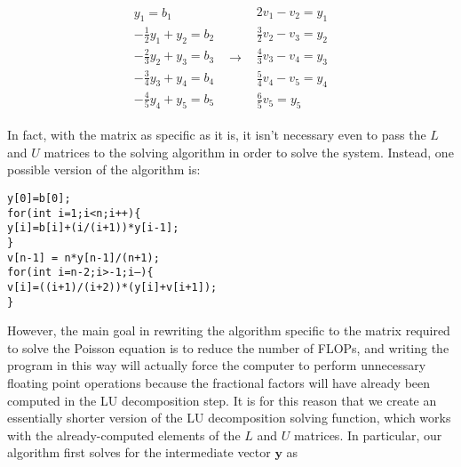 \documentclass[12pt]{article}
\numberwithin{equation}{section}
\begin{document}
\begin{equation}
\label{eq:easylusolver}
\begin{array}{ccc}
\begin{array}{c}
y_{1}=b_{1} \\
-\frac{1}{2}y_{1}+y_{2}=b_{2} \\
-\frac{2}{3}y_{2}+y_{3}=b_{3} \\
-\frac{3}{4}y_{3}+y_{4}=b_{4} \\
-\frac{4}{5}y_{4}+y_{5}=b_{5}
\end{array} & \rightarrow &
\begin{array}{c}
2v_{1}-v_{2}=y_{1} \\
\frac{3}{2}v_{2}-v_{3}=y_{2} \\
\frac{4}{3}v_{3}-v_{4}=y_{3} \\
\frac{5}{4}v_{4}-v_{5}=y_{4} \\
\frac{6}{5}v_{5}=y_{5}
\end{array}
\end{array}
\end{equation}

\noindent In fact, with the matrix as specific as it is, it isn't necessary even to pass the $L$ and $U$ matrices to the solving algorithm in order to solve the system.  Instead, one possible version of the algorithm is:

\begin{1stlisting}
\texttt{y[0]=b[0]; \\ \indent for(int i=1;i<n;i++)\{ \\ \indent\indent y[i]=b[i]+(i/(i+1))*y[i-1]; \\\indent \} \\\indent v[n-1] = n*y[n-1]/(n+1); \\ \indent
for(int i=n-2;i>-1;i--)\{ \\\indent \indent v[i]=((i+1)/(i+2))*(y[i]+v[i+1]); \\\indent \}}
\end{1stlisting}

\noindent However, the main goal in rewriting the algorithm specific to the matrix required to solve the Poisson equation is to reduce the number of FLOPs, and writing the program in this way will actually force the computer to perform unnecessary floating point operations because the fractional factors will have already been computed in the LU decomposition step.  It is for this reason that we create an essentially shorter version of the LU decomposition solving function, which works with the already-computed elements of the $L$ and $U$ matrices.  In particular, our algorithm first solves for the intermediate vector $\textbf{y}$ as 
\end{document}
